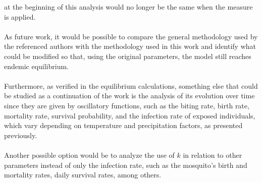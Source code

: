 at the beginning of this analysis would no longer be the same when 
the measure is applied.
\\\\
As future work, it would be possible to compare the general 
methodology used by the referenced authors with the methodology 
used in this work and identify what could be modified so that, 
using the original parameters, the model still reaches endemic equilibrium.
\\\\
Furthermore, as verified in the equilibrium calculations, 
something else that could be studied as a continuation of 
the work is the analysis of its evolution over time since 
they are given by oscillatory functions, such as the biting 
rate, birth rate, mortality rate, survival probability, and 
the infection rate of exposed individuals, which vary 
depending on temperature and precipitation factors, as presented previously. 
\\\\
Another possible option would be to analyze the use of $k$ in relation to other 
parameters instead of only the infection rate,
such as the mosquito's birth and mortality rates, daily survival rates, among others.
